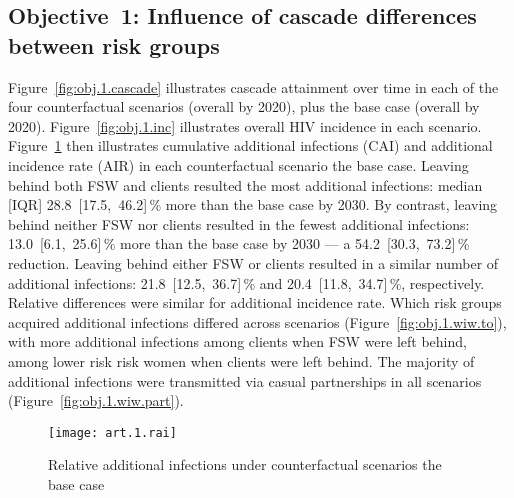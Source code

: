 \subsection{Objective~1: Influence of cascade differences between risk groups}\label{res.obj.1}
Figure~\ref{fig:obj.1.cascade} illustrates cascade attainment over time
in each of the four counterfactual scenarios (\casmd overall by 2020),
plus the base case (\cashi overall by 2020).
Figure~\ref{fig:obj.1.inc} illustrates overall HIV incidence in each scenario.
Figure~\ref{fig:obj.1.rai} then illustrates
cumulative additional infections (CAI) and additional incidence rate (AIR)
in each counterfactual scenario \vs the base case.
Leaving behind both FSW and clients resulted the most additional infections: median [IQR]
28.8~[17.5,~46.2]\,\% more than the base case by 2030. %
By contrast, leaving behind neither FSW nor clients resulted in the fewest additional infections:
13.0~[6.1,~25.6]\,\% more than the base case by 2030 --- %
a 54.2~[30.3,~73.2]\,\% reduction. %
Leaving behind either FSW or clients resulted in a similar number of additional infections:
21.8~[12.5,~36.7]\,\% and 20.4~[11.8,~34.7]\,\%, respectively. %
Relative differences were similar for additional incidence rate.
Which risk groups acquired additional infections differed across scenarios
(Figure~\ref{fig:obj.1.wiw.to}),
with more additional infections among clients when FSW were left behind,
\vs among lower risk risk women when clients were left behind.
The majority of additional infections were transmitted
via casual partnerships in all scenarios (Figure~\ref{fig:obj.1.wiw.part}). %
\begin{figure}[h]
  \centering\texttt{[image: art.1.rai]}
  \caption{Relative additional infections under counterfactual scenarios \vs the base case}
  \label{fig:obj.1.rai}
\end{figure}
